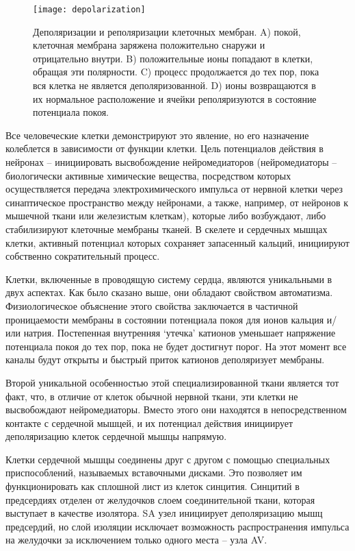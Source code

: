 \begin{figure}[h]
	\begin{center}
		\texttt{[image: depolarization]}
		\caption{Деполяризации и реполяризации клеточных мембран.
			A) покой, клеточная мембрана заряжена положительно снаружи и отрицательно внутри. B) положительные ионы попадают в клетки, обращая эти полярности. C)
			процесс продолжается до тех пор, пока вся клетка не является деполяризованной. D)
			ионы возвращаются в их нормальное расположение и ячейки реполяризуются в состояние потенциала покоя.}
		\label{ris:depolarization}
	\end{center}
\end{figure}

Все человеческие клетки демонстрируют это явление, но его назначение колеблется в зависимости от функции клетки. Цель потенциалов действия в нейронах -- инициировать высвобождение нейромедиаторов (нейромедиаторы -- биологически активные химические вещества, посредством которых осуществляется передача электрохимического импульса от нервной клетки через синаптическое пространство между нейронами, а также, например, от нейронов к мышечной ткани или железистым клеткам), которые либо возбуждают, либо стабилизируют клеточные мембраны тканей. В скелете и сердечных мышцах клетки, активный потенциал которых сохраняет запасенный кальций, инициируют собственно сократительный процесс.

Клетки, включенные в проводящую систему сердца, являются уникальными в двух аспектах. Как было сказано выше, они обладают свойством автоматизма. Физиологическое объяснение этого свойства заключается в частичной проницаемости мембраны в состоянии потенциала покоя для ионов кальция и/или натрия. Постепенная внутренняя ‘утечка’ катионов уменьшает напряжение потенциала покоя до тех пор, пока не будет достигнут порог. На этот момент все каналы будут открыты и быстрый приток катионов деполяризует мембраны.

Второй уникальной особенностью этой специализированной ткани является тот факт, что, в отличие от клеток обычной нервной ткани, эти клетки не высвобождают нейромедиаторы. Вместо этого они находятся в непосредственном контакте с сердечной мышцей, и их потенциал действия инициирует деполяризацию клеток сердечной мышцы напрямую.

Клетки сердечной мышцы соединены друг с другом с помощью специальных приспособлений, называемых вставочными дисками. Это позволяет им функционировать как сплошной лист из клеток синцития. Синцитий в предсердиях отделен от желудочков слоем соединительной ткани, которая выступает в качестве изолятора. SA узел инициирует деполяризацию мышц предсердий, но слой изоляции исключает возможность распространения импульса на желудочки за исключением только одного места -- узла AV. 

